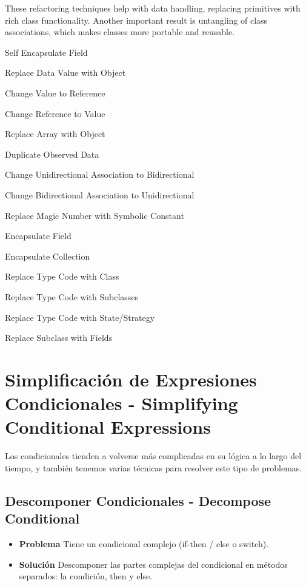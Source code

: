 \documentclass[11pt,a4paper,oneside]{book}
\begin{document}
These refactoring techniques help with data handling, replacing primitives with rich class functionality. Another important result is untangling of class associations, which makes classes more portable and reusable.

    Self Encapsulate Field
    
    Replace Data Value with Object
    
    Change Value to Reference
    
    Change Reference to Value
    
    Replace Array with Object
    
    Duplicate Observed Data
    
    Change Unidirectional Association to Bidirectional
    
    Change Bidirectional Association to Unidirectional
    
    Replace Magic Number with Symbolic Constant
    
    Encapsulate Field
    
    Encapsulate Collection
    
    Replace Type Code with Class
    
    Replace Type Code with Subclasses
    
    Replace Type Code with State/Strategy
    
    Replace Subclass with Fields




\section{Simplificación de Expresiones Condicionales - Simplifying Conditional Expressions}

\label{renombrarmetodo}Los condicionales tienden a volverse más complicadas en su lógica a lo largo del tiempo, y también tenemos varias técnicas para resolver este tipo de problemas.

\subsection{Descomponer Condicionales - Decompose Conditional}  
\begin{itemize}
    \item \textbf{Problema} Tiene un condicional complejo (if-then / else o switch).
    
    
    
    \item \textbf{Solución} Descomponer las partes complejas del condicional en métodos separados: la condición, then y else.
    
    
\end{itemize}
\end{document}
